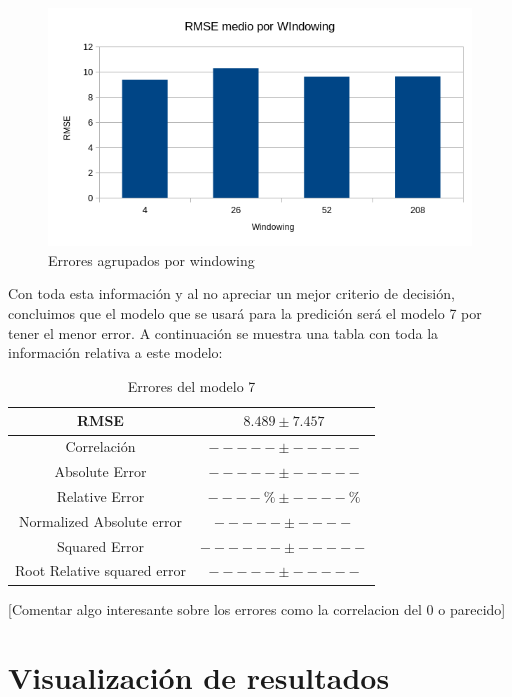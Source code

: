 \documentclass[12pt]{report} %
\begin{document}
\begin{figure}[H]
    \includegraphics[width=\linewidth]{RMSE-windowing.png}
    \caption {\small Errores agrupados por windowing}
\end{figure}

Con toda esta información y al no apreciar un mejor criterio de decisión, concluimos que el modelo que se usará para la predición será el modelo 7 por tener el menor error. A continuación se muestra una tabla con toda la información relativa a este modelo:

\begin{table}[H]
\begin{center}
\begin{tabular}{|c|c|}
    \hline
    RMSE                        & $8.489\pm 7.457$\\ 
    \hline
    Correlación                 & $-----\pm -----$\\
    \hline
    Absolute Error              & $-----\pm-----$\\
    \hline
    Relative Error              & $----\%\pm ----\%$\\
    \hline
    Normalized Absolute error   & $-----\pm----$\\
    \hline
    Squared Error               & $------\pm -----$\\ 
    \hline
    Root Relative squared error & $----- \pm -----$\\
    \hline
\end{tabular}
\caption{Errores del modelo 7}
\end{center}
\end{table}

[Comentar algo interesante sobre los errores como la correlacion del 0 o parecido]

\chapter{Visualización de resultados}
\label{chap:result-visualizing}
\end{document}
